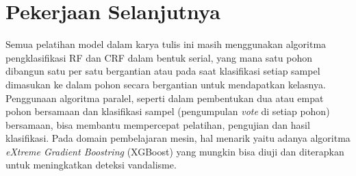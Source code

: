 \section{Pekerjaan Selanjutnya}

Semua pelatihan model dalam karya tulis ini masih menggunakan algoritma
pengklasifikasi RF dan CRF dalam bentuk serial, yang mana satu pohon dibangun
satu per satu bergantian atau pada saat klasifikasi setiap sampel dimasukan ke
dalam pohon secara bergantian untuk mendapatkan kelasnya.
Penggunaan algoritma paralel, seperti dalam pembentukan dua atau empat pohon
bersamaan dan klasifikasi sampel (pengumpulan \textit{vote} di setiap pohon)
bersamaan, bisa membantu mempercepat pelatihan, pengujian dan hasil
klasifikasi.
Pada domain pembelajaran mesin, hal menarik yaitu adanya algoritma
\textit{eXtreme Gradient Boostring} (XGBoost) \cite{chen2016xgboost} yang
mungkin bisa diuji dan diterapkan untuk meningkatkan deteksi vandalisme.

